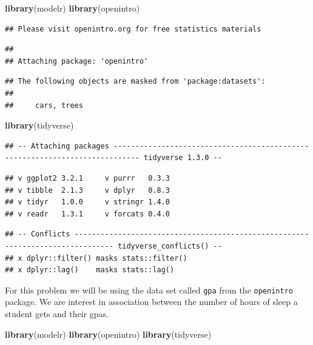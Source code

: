 \documentclass[]{article}
\newenvironment{Shaded}{\begin{snugshade}}{\end{snugshade}}
\newcommand{\KeywordTok}[1]{\textcolor[rgb]{0.13,0.29,0.53}{\textbf{#1}}}
\newcommand{\NormalTok}[1]{#1}
\begin{document}
\begin{Shaded}
\begin{Highlighting}[]
\KeywordTok{library}\NormalTok{(modelr)}
\KeywordTok{library}\NormalTok{(openintro)}
\end{Highlighting}
\end{Shaded}

\begin{verbatim}
## Please visit openintro.org for free statistics materials
\end{verbatim}

\begin{verbatim}
## 
## Attaching package: 'openintro'
\end{verbatim}

\begin{verbatim}
## The following objects are masked from 'package:datasets':
## 
##     cars, trees
\end{verbatim}

\begin{Shaded}
\begin{Highlighting}[]
\KeywordTok{library}\NormalTok{(tidyverse)}
\end{Highlighting}
\end{Shaded}

\begin{verbatim}
## -- Attaching packages ---------------------------------------------------------------------------- tidyverse 1.3.0 --
\end{verbatim}

\begin{verbatim}
## v ggplot2 3.2.1     v purrr   0.3.3
## v tibble  2.1.3     v dplyr   0.8.3
## v tidyr   1.0.0     v stringr 1.4.0
## v readr   1.3.1     v forcats 0.4.0
\end{verbatim}

\begin{verbatim}
## -- Conflicts ------------------------------------------------------------------------------- tidyverse_conflicts() --
## x dplyr::filter() masks stats::filter()
## x dplyr::lag()    masks stats::lag()
\end{verbatim}

For this problem we will be using the data set called \texttt{gpa} from
the \texttt{openintro} package. We are interest in association between
the number of hours of sleep a student gets and their gpas.

\begin{Shaded}
\begin{Highlighting}[]
\KeywordTok{library}\NormalTok{(modelr)}
\KeywordTok{library}\NormalTok{(openintro)}
\KeywordTok{library}\NormalTok{(tidyverse)}
\end{Highlighting}
\end{Shaded}
\end{document}
